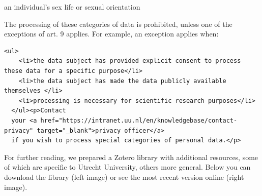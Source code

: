 \documentclass[
]{book}
\begin{document}
an individual's sex life or sexual orientation

The processing of these categories of data is
prohibited, unless one of the exceptions of
art. 9 applies.
For example, an exception applies when:

\begin{verbatim}
<ul>
    <li>the data subject has provided explicit consent to process these data for a specific purpose</li>
    <li>the data subject has made the data publicly available themselves </li>
    <li>processing is necessary for scientific research purposes</li>
  </ul><p>Contact 
  your <a href="https://intranet.uu.nl/en/knowledgebase/contact-privacy" target="_blank">privacy officer</a> 
  if you wish to process special categories of personal data.</p>
\end{verbatim}

For further reading, we prepared a Zotero library with additional resources, some
of which are specific to Utrecht University, others more general. Below you can
download the library (left image) or see the most recent version online (right
image).

  
\end{document}
